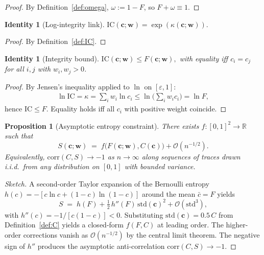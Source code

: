 \documentclass[
  aps,
  prd,
  twocolumn,
  superscriptaddress,
  nofootinbib,
  floatfix
]{revtex4-2}
\newtheorem{proposition}[theorem]{Proposition}
\newtheorem{identity}[theorem]{Identity}
\newcommand{\eps}{\varepsilon}
\newcommand{\tvec}{\mathbf{c}}
\newcommand{\wvec}{\mathbf{w}}
\newcommand{\IC}{\mathrm{IC}}
\newcommand{\corr}{\mathrm{corr}}
\newcommand{\stddev}{\mathrm{std}}
\newcommand{\Real}{\mathbb{R}}
\begin{document}
\begin{proof}
By Definition~\ref{def:omega}, $\omega:=1-F$, so $F+\omega \equiv 1$.
\end{proof}

\begin{identity}[Log-integrity link]\label{id:link}
$\IC(\tvec;\wvec) = \exp(\kappa(\tvec;\wvec)).$
\end{identity}

\begin{proof}
By Definition~\ref{def:IC}.
\end{proof}

\begin{identity}[Integrity bound]\label{id:bound}
$\IC(\tvec;\wvec) \leq F(\tvec;\wvec),$ with equality iff
$c_i = c_j$ for all $i,j$ with $w_i,w_j>0$.
\end{identity}

\begin{proof}
By Jensen's inequality applied to $\ln$ on $[\eps,1]$:
\begin{align}
  \ln \IC = \kappa = \sum_i w_i \ln c_i
         \leq \ln\!\Big(\sum_i w_i c_i\Big) = \ln F,
\end{align}
hence $\IC\leq F$.  Equality holds iff all $c_i$ with positive
weight coincide.
\end{proof}

\begin{proposition}[Asymptotic entropy constraint]\label{prop:Sconstraint}
There exists $f:[0,1]^2\to\Real$ such that
\begin{equation}\label{eq:Sasymptotic}
  S(\tvec;\wvec) \;=\; f\!\big(F(\tvec;\wvec), C(\tvec)\big) + \mathcal{O}(n^{-1/2}).
\end{equation}
Equivalently, $\corr(C,S)\to -1$ as $n\to\infty$ along
sequences of traces drawn i.i.d.\ from any distribution on
$[0,1]$ with bounded variance.
\end{proposition}

\begin{proof}[Sketch]
A second-order Taylor expansion of the Bernoulli entropy
$h(c)=-[c\ln c+(1-c)\ln(1-c)]$ around the mean $\bar c=F$ yields
\begin{equation}
  S \;=\; h(F) + \tfrac{1}{2}\, h''(F)\,\stddev(\tvec)^2 + \mathcal{O}(\stddev^3),
\end{equation}
with $h''(c) = -1/[c(1-c)] < 0$.  Substituting
$\stddev(\tvec) = 0.5\,C$ from Definition~\ref{def:C} yields a
closed-form $f(F,C)$ at leading order.  The higher-order
corrections vanish as $\mathcal{O}(n^{-1/2})$ by the central
limit theorem.  The negative sign of $h''$ produces the
asymptotic anti-correlation $\corr(C,S)\to -1$.
\end{proof}
\end{document}
